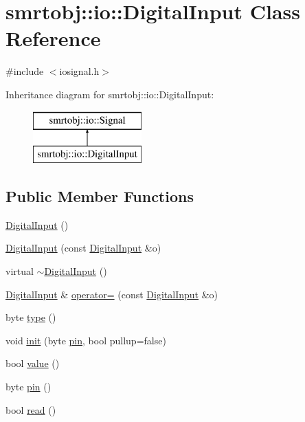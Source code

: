 \hypertarget{classsmrtobj_1_1io_1_1_digital_input}{}\section{smrtobj\+:\+:io\+:\+:Digital\+Input Class Reference}
\label{classsmrtobj_1_1io_1_1_digital_input}


{\ttfamily \#include $<$iosignal.\+h$>$}

Inheritance diagram for smrtobj\+:\+:io\+:\+:Digital\+Input\+:\begin{figure}[H]
\begin{center}
\leavevmode
\includegraphics[height=2.000000cm]{classsmrtobj_1_1io_1_1_digital_input}
\end{center}
\end{figure}
\subsection*{Public Member Functions}
\begin{DoxyCompactItemize}
\item 
\hyperlink{classsmrtobj_1_1io_1_1_digital_input_af2ef9ec74d536240b0857f0de1c02796}{Digital\+Input} ()
\item 
\hyperlink{classsmrtobj_1_1io_1_1_digital_input_afe5da52de886356d5029b7fd15655c19}{Digital\+Input} (const \hyperlink{classsmrtobj_1_1io_1_1_digital_input}{Digital\+Input} \&o)
\item 
virtual \hyperlink{classsmrtobj_1_1io_1_1_digital_input_a35b580da1540a13d37eedb2344d95bf7}{$\sim$\+Digital\+Input} ()
\item 
\hyperlink{classsmrtobj_1_1io_1_1_digital_input}{Digital\+Input} \& \hyperlink{classsmrtobj_1_1io_1_1_digital_input_a609bdafe6cf1327b70fee98080a54dd5}{operator=} (const \hyperlink{classsmrtobj_1_1io_1_1_digital_input}{Digital\+Input} \&o)
\item 
byte \hyperlink{classsmrtobj_1_1io_1_1_digital_input_a89f92208f29c7ca20cdc35689c8aad6a}{type} ()
\item 
void \hyperlink{classsmrtobj_1_1io_1_1_digital_input_a71826ab0ec74668d3f3d5feec91f659d}{init} (byte \hyperlink{classsmrtobj_1_1io_1_1_digital_input_aa6bbdb4628b50d70084de992aaeee3ed}{pin}, bool pullup=false)
\item 
bool \hyperlink{classsmrtobj_1_1io_1_1_digital_input_a298b5554b20605d9265e225414299c1c}{value} ()
\item 
byte \hyperlink{classsmrtobj_1_1io_1_1_digital_input_aa6bbdb4628b50d70084de992aaeee3ed}{pin} ()
\item 
bool \hyperlink{classsmrtobj_1_1io_1_1_digital_input_a606e21b6c15a53bf5fe9aad68f997d38}{read} ()
\end{DoxyCompactItemize}

